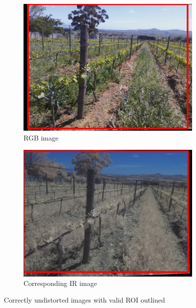 \begin{figure}[H]
\begin{subfigure}{0.5\textwidth}
\centering
\includegraphics[scale=0.17]{images/rgb_undistorted.jpg}
\caption{RGB image}
\label{fig:rgb_undistorted}
\end{subfigure}
\begin{subfigure}{0.5\textwidth}
\centering
\includegraphics[scale=0.17]{images/ir_undistorted.jpg}
\caption{Corresponding IR image}
\label{fig:ir_undistorted}
\end{subfigure}
\caption{Correctly undistorted images with valid ROI outlined}
\label{fig:undistorted_roi}
\end{figure}